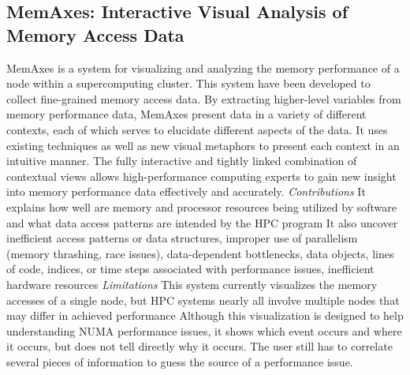 \subsection{MemAxes: Interactive Visual Analysis of Memory Access Data}
MemAxes is a system for visualizing and analyzing the memory performance of a node within a supercomputing cluster. This system have been developed to collect fine-grained memory access data. By extracting higher-level variables from memory performance data, MemAxes present data in a variety of different contexts, each of which serves to elucidate different aspects of the data. It uses existing techniques as well as new visual metaphors to present each context in an intuitive manner. The fully interactive and tightly linked combination of contextual views allows high-performance computing experts to gain new insight into memory performance data effectively and accurately.\newline
\textit{Contributions}\newline
It explains how well are memory and processor resources being utilized by software and what data access patterns are intended by the HPC program
It also uncover inefficient access patterns or data structures, improper use of parallelism (memory thrashing, race issues), data-dependent bottlenecks, data objects, lines of code, indices, or time steps associated with performance issues, inefficient hardware resources
\newline
\textit{Limitations}\newline
This system currently visualizes the memory accesses of a single node, but HPC systems nearly all involve multiple nodes that may differ in achieved performance
Although this visualization is designed to help understanding NUMA performance issues, it shows which event occurs and where it occurs, but does not tell directly why it occurs. The user still has to correlate several pieces of information to guess the source of a performance issue.

